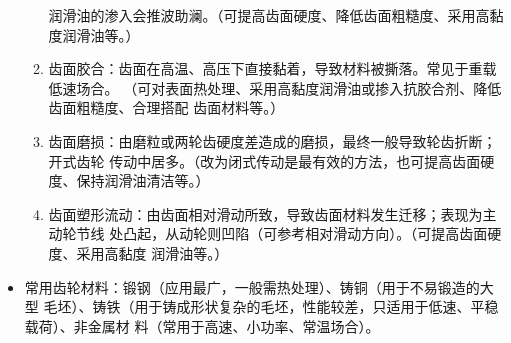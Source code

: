 \documentclass[12pt,a4paper]{article}
\newcommand{\hint}[1]{\textsf{（#1）}}
\begin{document}
\begin{itemize}
\begin{enumerate}
        润滑油的渗入会推波助澜。\hint{可提高齿面硬度、降低齿面粗糙度、采用高黏度润滑油等。}
        \item 齿面胶合：齿面在高温、高压下直接黏着，导致材料被撕落。常见于重载低速场合。
        \hint{可对表面热处理、采用高黏度润滑油或掺入抗胶合剂、降低齿面粗糙度、合理搭配
        齿面材料等。}
        \item 齿面磨损：由磨粒或两轮齿硬度差造成的磨损，最终一般导致轮齿折断；开式齿轮
        传动中居多。\hint{改为闭式传动是最有效的方法，也可提高齿面硬度、保持润滑油清洁等。}
        \item 齿面塑形流动：由齿面相对滑动所致，导致齿面材料发生迁移；表现为主动轮节线
        处凸起，从动轮则凹陷\hint{可参考相对滑动方向}。\hint{可提高齿面硬度、采用高黏度
        润滑油等。}
    \end{enumerate}
    \item 常用齿轮材料：锻钢\hint{应用最广，一般需热处理}、铸铜\hint{用于不易锻造的大型
    毛坯}、铸铁\hint{用于铸成形状复杂的毛坯，性能较差，只适用于低速、平稳载荷}、非金属材
    料\hint{常用于高速、小功率、常温场合}。
\end{itemize}
\end{document}
